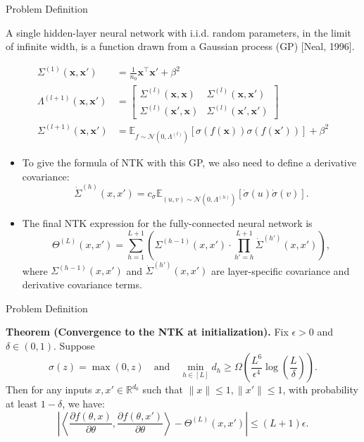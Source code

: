 \documentclass[serif, aspectratio=169]{beamer}
\begin{document}
\begin{frame}{Problem Definition}
	
	
	A single hidden-layer neural network with i.i.d. random parameters, in the limit
	of infinite width, is a function drawn from a Gaussian process (GP) [Neal, 1996].
	
	\[
	\begin{aligned}
		\Sigma^{(1)}(\mathbf{x}, \mathbf{x}') &= \frac{1}{n_0}\mathbf{x}^\top{\mathbf{x}'} + \beta^2 \\
		\Lambda^{(l+1)}(\mathbf{x}, \mathbf{x}') &= \begin{bmatrix}
			\Sigma^{(l)}(\mathbf{x}, \mathbf{x}) & \Sigma^{(l)}(\mathbf{x}, \mathbf{x}') \\
			\Sigma^{(l)}(\mathbf{x}', \mathbf{x}) & \Sigma^{(l)}(\mathbf{x}', \mathbf{x}')
		\end{bmatrix} \\
		\Sigma^{(l+1)}(\mathbf{x}, \mathbf{x}') &= \mathbb{E}_{f \sim \mathcal{N}(0, \Lambda^{(l)})}[\sigma(f(\mathbf{x})) \sigma(f(\mathbf{x}'))] + \beta^2
	\end{aligned}
	\]
	
	
\end{frame}


\begin{frame}

 \begin{itemize}
 	
 \item To give the formula of NTK with this GP, we also need to define a derivative covariance:
 \[
 \dot{\Sigma}^{(h)}(x, x') = c_\sigma \mathbb{E}_{(u, v) \sim \mathcal{N}(0, \Lambda^{(h)})} \left[ \dot{\sigma}(u) \dot{\sigma}(v) \right].
 \]
 
 \item The final NTK expression for the fully-connected neural network is
 \[
 \Theta^{(L)}(x, x') = \sum_{h=1}^{L+1} \left( \Sigma^{(h-1)}(x, x') \cdot \prod_{h'=h}^{L+1} \dot{\Sigma}^{(h')}(x, x') \right),
 \]
 where \( \Sigma^{(h-1)}(x, x') \) and \( \dot{\Sigma}^{(h')}(x, x') \) are layer-specific covariance and derivative covariance terms.
 
 \end{itemize}
\end{frame}
 
 \begin{frame}{Problem Definition}
 	
 \textbf{Theorem (Convergence to the NTK at initialization).} Fix $\epsilon > 0$ and $\delta \in (0,1)$. Suppose 
 \[
 \sigma(z) = \max(0, z) \quad \text{and} \quad \min_{h \in [L]} d_h \geq \Omega\left(\frac{L^6}{\epsilon^4} \log\left(\frac{L}{\delta}\right)\right).
 \]
 Then for any inputs $x, x' \in \mathbb{R}^{d_0}$ such that $\|x\| \leq 1, \|x'\| \leq 1$, with probability at least $1 - \delta$, we have:
 \[
 \left| \left\langle \frac{\partial f(\theta, x)}{\partial \theta}, \frac{\partial f(\theta, x')}{\partial \theta} \right\rangle - \Theta^{(L)}(x, x') \right| \leq (L + 1)\epsilon.
 \]
 \end{frame}
 
\end{document}
